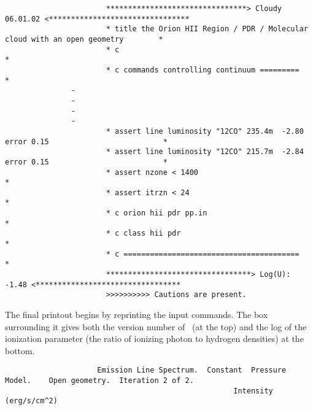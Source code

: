 {\setverbatimfontsize{\tiny}
\begin{verbatim}
                       ********************************> Cloudy 06.01.02 <********************************
                       * title the Orion HII Region / PDR / Molecular cloud with an open geometry        *
                       * c                                                                               *
                       * c commands controlling continuum =========                                      *
               -
               -
               -
               -
                       * assert line luminosity "12CO" 235.4m  -2.80 error 0.15                          *
                       * assert line luminosity "12CO" 215.7m  -2.84 error 0.15                          *
                       * assert nzone < 1400                                                             *
                       * assert itrzn < 24                                                               *
                       * c orion hii pdr pp.in                                                           *
                       * c class hii pdr                                                                 *
                       * c ========================================                                      *
                       *********************************> Log(U): -1.48 <*********************************
                       >>>>>>>>>> Cautions are present.
\end{verbatim}
}

The final printout begins by reprinting the input commands.
The box
surrounding it gives both the version number of \Cloudy\ (at the top) and
the log of the ionization parameter (the ratio of ionizing photon
to hydrogen densities) at the bottom.
{\setverbatimfontsize{\tiny}
\begin{verbatim}
                     Emission Line Spectrum.  Constant  Pressure Model.    Open geometry.  Iteration 2 of 2.
                                                    Intensity (erg/s/cm^2)
\end{verbatim}
}

